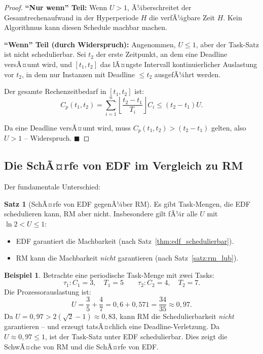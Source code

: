 ﻿\documentclass[a4paper,12pt]{report}
\theoremstyle{definition}
\newtheorem{beispiel}{Beispiel}[chapter]
\newtheorem{satz}{Satz}[chapter]
\begin{document}
\begin{proof}
	\textbf{``Nur wenn'' Teil:} Wenn $U > 1$, Ã¼berschreitet der Gesamtrechenaufwand
	in der Hyperperiode $H$ die verfÃ¼gbare Zeit $H$. Kein Algorithmus kann diesen
	Schedule machbar machen.

	\textbf{``Wenn'' Teil (durch Widerspruch):} Angenommen, $U \leq 1$, aber der
	Task-Satz ist nicht schedulierbar. Sei $t_2$ der erste Zeitpunkt, an dem eine
	Deadline versÃ¤umt wird, und $[t_1, t_2]$ das lÃ¤ngste Intervall kontinuierlicher
	Auslastung vor $t_2$, in dem nur Instanzen mit Deadline $\leq t_2$ ausgefÃ¼hrt werden.

	Der gesamte Rechenzeitbedarf in $[t_1, t_2]$ ist:
	\[
		C_p(t_1, t_2) = \sum_{i=1}^{n} \left\lfloor \frac{t_2 - t_1}{T_i} \right\rfloor C_i \leq (t_2 - t_1) U.
	\]

	Da eine Deadline versÃ¤umt wird, muss $C_p(t_1, t_2) > (t_2 - t_1)$ gelten,
	also $U > 1$ -- Widerspruch. \hfill$\blacksquare$
\end{proof}

\subsection{Die SchÃ¤rfe von EDF im Vergleich zu RM}

Der fundamentale Unterschied:

\begin{satz}[SchÃ¤rfe von EDF gegenÃ¼ber RM]
	\label{satz:edf_scharf}
	Es gibt Task-Mengen, die EDF schedulieren kann, RM aber nicht. Insbesondere gilt
	fÃ¼r alle $U$ mit $\ln 2 < U \leq 1$:
	\begin{itemize}
		\item EDF garantiert die Machbarkeit (nach Satz~\ref{thm:edf_schedulierbar}).
		\item RM kann die Machbarkeit \emph{nicht} garantieren (nach Satz~\ref{satz:rm_lub}).
	\end{itemize}
\end{satz}

\begin{beispiel}
	Betrachte eine periodische Task-Menge mit zwei Tasks:
	\[
		\tau_1: C_1 = 3, \quad T_1 = 5 \qquad \tau_2: C_2 = 4, \quad T_2 = 7.
	\]
	Die Prozessorauslastung ist:
	\[
		U = \frac{3}{5} + \frac{4}{7} = 0{,}6 + 0{,}571 = \frac{34}{35} \approx 0{,}97.
	\]
	Da $U = 0{,}97 > 2(\sqrt{2}-1) \approx 0{,}83$, kann RM die Schedulierbarkeit
	\emph{nicht} garantieren -- und erzeugt tatsÃ¤chlich eine Deadline-Verletzung.
	Da $U \approx 0{,}97 \leq 1$, ist der Task-Satz unter EDF schedulierbar.
	Dies zeigt die SchwÃ¤che von RM und die SchÃ¤rfe von EDF.
\end{beispiel}
\end{document}
